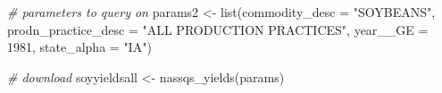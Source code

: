\documentclass[
]{book}
\newenvironment{Shaded}{\begin{snugshade}}{\end{snugshade}}
\newcommand{\AttributeTok}[1]{\textcolor[rgb]{0.77,0.63,0.00}{#1}}
\newcommand{\CommentTok}[1]{\textcolor[rgb]{0.56,0.35,0.01}{\textit{#1}}}
\newcommand{\DecValTok}[1]{\textcolor[rgb]{0.00,0.00,0.81}{#1}}
\newcommand{\FunctionTok}[1]{\textcolor[rgb]{0.00,0.00,0.00}{#1}}
\newcommand{\NormalTok}[1]{#1}
\newcommand{\OtherTok}[1]{\textcolor[rgb]{0.56,0.35,0.01}{#1}}
\newcommand{\StringTok}[1]{\textcolor[rgb]{0.31,0.60,0.02}{#1}}
\begin{document}
\begin{Shaded}
\begin{Highlighting}[]
\CommentTok{\# parameters to query on }
\NormalTok{params2 }\OtherTok{\textless{}{-}} \FunctionTok{list}\NormalTok{(}\AttributeTok{commodity\_desc =} \StringTok{"SOYBEANS"}\NormalTok{, }\AttributeTok{prodn\_practice\_desc =} \StringTok{"ALL PRODUCTION PRACTICES"}\NormalTok{, }\AttributeTok{year\_\_GE =} \DecValTok{1981}\NormalTok{, }\AttributeTok{state\_alpha =} \StringTok{"IA"}\NormalTok{)}

\CommentTok{\# download}
\NormalTok{soyyieldsall }\OtherTok{\textless{}{-}} \FunctionTok{nassqs\_yields}\NormalTok{(params)}
\end{Highlighting}
\end{Shaded}

\begin{verbatim}

\end{verbatim}
\end{document}

